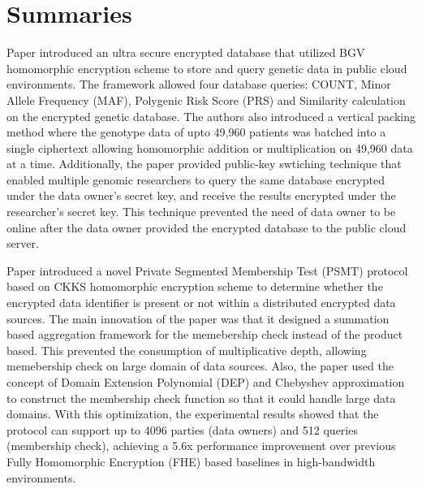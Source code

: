\documentclass[12pt]{article}
\begin{document}
\section{Summaries}
Paper \cite{blindenbach2024squid} introduced an ultra secure encrypted database that utilized BGV homomorphic encryption scheme \cite{brakerski2014leveled} to store and query genetic data in public cloud environments. The framework allowed four database queries: COUNT, Minor Allele Frequency (MAF), Polygenic Risk Score (PRS) and Similarity calculation on the encrypted genetic database. The authors also introduced a vertical packing method where the genotype data of upto 49,960 patients was batched into a single ciphertext allowing homomorphic addition or multiplication on 49,960 data at a time. Additionally, the paper \cite{blindenbach2024squid} provided public-key swtiching technique that enabled multiple genomic researchers to query the same database encrypted under the data owner's secret key, and receive the results encrypted under the researcher's secret key. This technique prevented the need of data owner to be online after the data owner provided the encrypted database to the public cloud server.

Paper \cite{koirala2025psmt} introduced a novel Private Segmented Membership Test (PSMT) protocol based on CKKS homomorphic encryption scheme \cite{cheon2017homomorphic} to determine whether the encrypted data identifier is present or not within a distributed encrypted data sources. The main innovation of the paper was that it designed a summation based aggregation framework for the memebership check instead of the product based. This prevented the consumption of multiplicative depth, allowing memebership check on large domain of data sources. Also, the paper used the concept of Domain Extension Polynomial (DEP) \cite{cheon2022efficient} and Chebyshev approximation to construct the membership check function so that it could handle large data domains. With this optimization, the experimental results showed that the protocol can support up to 4096 parties (data owners) and 512 queries (membership check), achieving a 5.6x performance improvement over previous Fully Homomorphic Encryption (FHE) based baselines in high-bandwidth environments.
\end{document}

